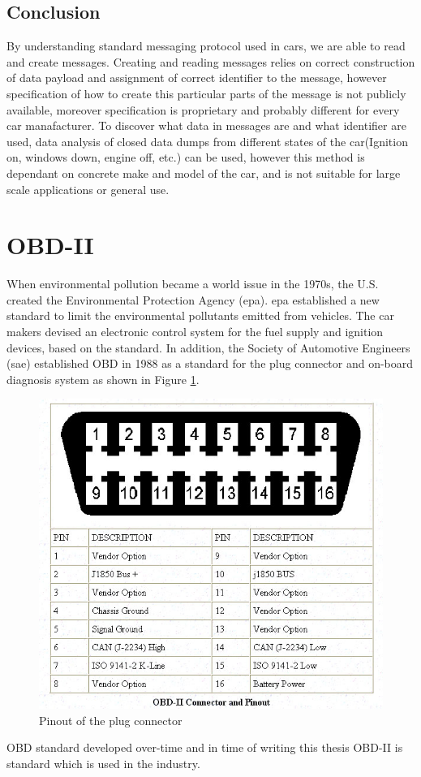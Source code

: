 \subsection{Conclusion} %
\label{sub:conclusion}
By understanding standard messaging protocol used in cars, we are able to read and create messages. Creating and reading messages relies on correct construction of data payload and assignment of correct identifier to the message, however specification of how to create this particular parts of the message is not publicly available, moreover specification is proprietary and probably different for every car manafacturer. To discover what data in messages are and what identifier are used, data analysis of closed data dumps from different states of the car(Ignition on, windows down, engine off, etc.) can be used, however this method is dependant on concrete make and model of the car, and is not suitable for large scale applications or general use.
\section{OBD-II}
When environmental pollution became a world issue in the 1970s, the U.S. created the Environmental Protection Agency (\gls{epa}). \gls{epa} established a new standard to limit the environmental pollutants emitted from vehicles. The car makers devised an electronic control system for the fuel supply and ignition devices, based on the standard. In addition, the Society of Automotive Engineers (\gls{sae}) established OBD in 1988 as a standard for the plug connector and on-board diagnosis system\cite{IJCSNS} as shown in Figure \ref{fig:obd_pinout}.
\begin{figure}[H]
\begin{center}
\captionsetup{font=small}
\includegraphics[scale=0.5]{pics/obd_pinout.jpg}
\caption{Pinout of the plug connector}
\label{fig:obd_pinout}
\end{center}
\end{figure}
OBD standard developed over-time and in time of writing this thesis OBD-II is standard which is used in the industry.
